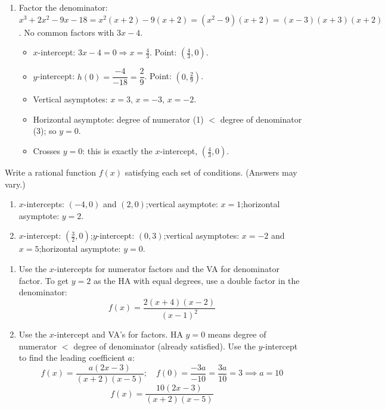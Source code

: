 \documentclass{ximera}
\begin{document}
\begin{problem}
\begin{solution}
\begin{enumerate}
  \item[(c)] Factor the denominator: $x^3+2x^2-9x-18 = x^2(x+2)-9(x+2) = (x^2-9)(x+2) = (x-3)(x+3)(x+2)$. No common factors with $3x-4$.
  \begin{itemize}
    \item $x$-intercept: $3x-4=0 \Rightarrow x=\tfrac{4}{3}$. Point: $\left(\tfrac{4}{3},0\right)$.
    \item $y$-intercept: $h(0) = \dfrac{-4}{-18} = \dfrac{2}{9}$. Point: $\left(0,\tfrac{2}{9}\right)$.
    \item Vertical asymptotes: $x=3$, $x=-3$, $x=-2$.
    \item Horizontal asymptote: degree of numerator (1) $<$ degree of denominator (3); so $y=0$.
    \item Crosses $y=0$: this is exactly the $x$-intercept, $\left(\tfrac{4}{3},0\right)$.
  \end{itemize}
\end{enumerate}
\end{solution}
\end{problem}


\begin{problem}
Write a rational function $f(x)$ satisfying each set of conditions. (Answers may vary.)
\begin{enumerate}
  \item[(a)] $x$-intercepts: $(-4,0)$ and $(2,0)$;\quad vertical asymptote: $x=1$;\quad horizontal asymptote: $y=2$.
  \medskip
  \item[(b)] $x$-intercept: $\left(\tfrac{3}{2},0\right)$;\quad $y$-intercept: $(0,3)$;\quad vertical asymptotes: $x=-2$ and $x=5$;\quad horizontal asymptote: $y=0$.
\end{enumerate}

\begin{solution}
\begin{enumerate}
  \item[(a)] Use the $x$-intercepts for numerator factors and the VA for denominator factor. To get $y=2$ as the HA with equal degrees, use a double factor in the denominator:
  $$f(x) = \frac{2(x+4)(x-2)}{(x-1)^2}$$

  \item[(b)] Use the $x$-intercept and VA's for factors. HA $y=0$ means degree of numerator $<$ degree of denominator (already satisfied). Use the $y$-intercept to find the leading coefficient $a$:
  $$f(x) = \frac{a(2x-3)}{(x+2)(x-5)}; \quad f(0) = \frac{-3a}{-10} = \frac{3a}{10} = 3 \implies a=10$$
  $$f(x) = \frac{10(2x-3)}{(x+2)(x-5)}$$
\end{enumerate}
\end{solution}
\end{problem}
\end{document}
